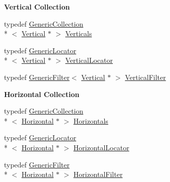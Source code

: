 \begin{Indent}{\bf Vertical Collection}\par
\begin{DoxyCompactItemize}
\item 
typedef \hyperlink{classHurricane_1_1GenericCollection}{Generic\-Collection}\\*
$<$ \hyperlink{classHurricane_1_1Vertical}{Vertical} $\ast$ $>$ \hyperlink{namespaceHurricane_a146e2d3d34b4035aff422f12e85345b9}{Verticals}
\item 
typedef \hyperlink{classHurricane_1_1GenericLocator}{Generic\-Locator}\\*
$<$ \hyperlink{classHurricane_1_1Vertical}{Vertical} $\ast$ $>$ \hyperlink{namespaceHurricane_a0b7ececb547a716d7d509210a271aae4}{Vertical\-Locator}
\item 
typedef \hyperlink{classHurricane_1_1GenericFilter}{Generic\-Filter}$<$ \hyperlink{classHurricane_1_1Vertical}{Vertical} $\ast$ $>$ \hyperlink{namespaceHurricane_a3ac8462f707e425944df83c57835b13d}{Vertical\-Filter}
\end{DoxyCompactItemize}
\end{Indent}
\begin{Indent}{\bf Horizontal Collection}\par
\begin{DoxyCompactItemize}
\item 
typedef \hyperlink{classHurricane_1_1GenericCollection}{Generic\-Collection}\\*
$<$ \hyperlink{classHurricane_1_1Horizontal}{Horizontal} $\ast$ $>$ \hyperlink{namespaceHurricane_a721e644c7d97f2f66049ab062140b855}{Horizontals}
\item 
typedef \hyperlink{classHurricane_1_1GenericLocator}{Generic\-Locator}\\*
$<$ \hyperlink{classHurricane_1_1Horizontal}{Horizontal} $\ast$ $>$ \hyperlink{namespaceHurricane_a7f4e07165be3dfcec8786e88370bdb67}{Horizontal\-Locator}
\item 
typedef \hyperlink{classHurricane_1_1GenericFilter}{Generic\-Filter}\\*
$<$ \hyperlink{classHurricane_1_1Horizontal}{Horizontal} $\ast$ $>$ \hyperlink{namespaceHurricane_a56eb48037c2e1295fafe761bf179bf01}{Horizontal\-Filter}
\end{DoxyCompactItemize}
\end{Indent}
